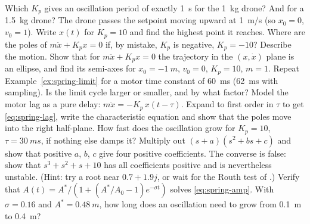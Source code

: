 \begin{exercises}
\exercise[1] Which $K_p$ gives an oscillation period of exactly \SI{1}{s} for the \SI{1}{kg} drone? And for a \SI{1.5}{kg} drone?
\exercise[1] The drone passes the setpoint moving upward at \SI{1}{m/s} (so $x_0 = 0$, $v_0 = 1$). Write $x(t)$ for $K_p = 10$ and find the highest point it reaches.
\exercise[1] Where are the poles of $m\ddot x + K_p x = 0$ if, by mistake, $K_p$ is negative, $K_p = -10$? Describe the motion.
\exercise[2] Show that for $m\ddot x + K_p x = 0$ the trajectory in the $(x, \dot x)$ plane is an ellipse, and find its semi-axes for $x_0 = \SI{-1}{m}$, $v_0 = 0$, $K_p = 10$, $m = 1$.
\exercise[2] Repeat Example~\ref{ex:spring-limit} for a motor time constant of \SI{60}{ms} (\SI{62}{ms} with sampling). Is the limit cycle larger or smaller, and by what factor?
\exercise[3] Model the motor lag as a pure delay: $m\ddot x = -K_p\,x(t-\tau)$. Expand to first order in $\tau$ to get \cref{eq:spring-lag}, write the characteristic equation and show that the poles move into the right half-plane. How fast does the oscillation grow for $K_p = 10$, $\tau = \SI{30}{ms}$, if nothing else damps it?
\exercise[2] Multiply out $(s + a)(s^2 + bs + c)$ and show that positive $a$, $b$, $c$ give four positive coefficients. The converse is false: show that $s^3 + s^2 + s + 10$ has all coefficients positive and is nevertheless unstable. (Hint: try a root near $0.7 + 1.9j$, or wait for the Routh test of .)
\exercise[2] Verify that $A(t) = A^*/(1 + (A^*/A_0 - 1)e^{-\sigma t})$ solves \cref{eq:spring-amp}. With $\sigma = 0.16$ and $A^* = \SI{0.48}{m}$, how long does an oscillation need to grow from \SI{0.1}{m} to \SI{0.4}{m}?

\end{exercises}
